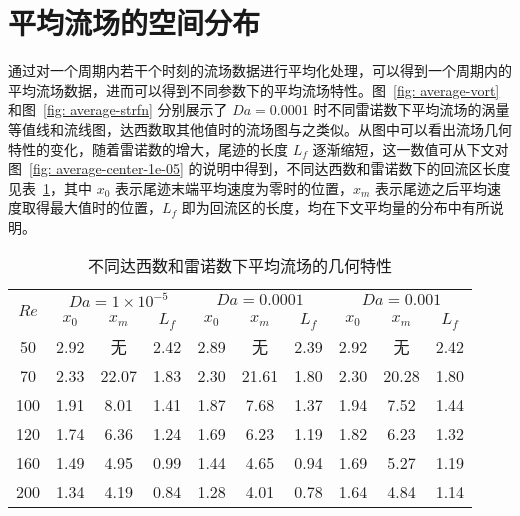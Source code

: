 \clearpage
\section{平均流场的空间分布}\label{sec: average}


通过对一个周期内若干个时刻的流场数据进行平均化处理，可以得到一个周期内的平均流场数据，进而可以得到不同参数下的平均流场特性。图~\ref{fig: average-vort} 和图~\ref{fig: average-strfn} 分别展示了 $Da=0.0001$ 时不同雷诺数下平均流场的涡量等值线和流线图，达西数取其他值时的流场图与之类似。从图中可以看出流场几何特性的变化，随着雷诺数的增大，尾迹的长度 $L_f$ 逐渐缩短，这一数值可从下文对图~\ref{fig: average-center-1e-05} 的说明中得到，不同达西数和雷诺数下的回流区长度见表~\ref{tab: geometry}，其中 $x_0$ 表示尾迹末端平均速度为零时的位置，$x_m$ 表示尾迹之后平均速度取得最大值时的位置，$L_f$ 即为回流区的长度，均在下文平均量的分布中有所说明。

\begin{table}[ht]
	\caption{不同达西数和雷诺数下平均流场的几何特性}\label{tab: geometry}
	\vspace{.5em}\centering\wuhao
	\begin{tabular}{*{10}{c}}
		\toprule[1.5pt]
		\multirow{2}[3]{*}{$Re$} & \multicolumn{3}{c}{$Da=1\times 10^{-5}$} & \multicolumn{3}{c}{$Da=0.0001$} & \multicolumn{3}{c}{$Da=0.001$} \\
		\cmidrule[.67pt](lr){2-4} \cmidrule[.67pt](lr){5-7} \cmidrule[.67pt](lr){8-10}
		& $x_0$ & $x_m$ & $L_f$ & $x_0$ & $x_m$ & $L_f$ & $x_0$ & $x_m$ & $L_f$ \\
		\midrule[1pt]
		50	& 2.92 & 无    & 2.42 & 2.89 & 无    & 2.39 & 2.92 & 无    & 2.42 \\
		70	& 2.33 & 22.07 & 1.83 & 2.30 & 21.61 & 1.80 & 2.30 & 20.28 & 1.80 \\
		100 & 1.91 & 8.01  & 1.41 & 1.87 & 7.68  & 1.37 & 1.94 & 7.52  & 1.44 \\
		120 & 1.74 & 6.36  & 1.24 & 1.69 & 6.23  & 1.19 & 1.82 & 6.23  & 1.32 \\
		160 & 1.49 & 4.95  & 0.99 & 1.44 & 4.65  & 0.94 & 1.69 & 5.27  & 1.19 \\
		200 & 1.34 & 4.19  & 0.84 & 1.28 & 4.01  & 0.78 & 1.64 & 4.84  & 1.14 \\
		\bottomrule[1.5pt]
	\end{tabular}
\end{table}

